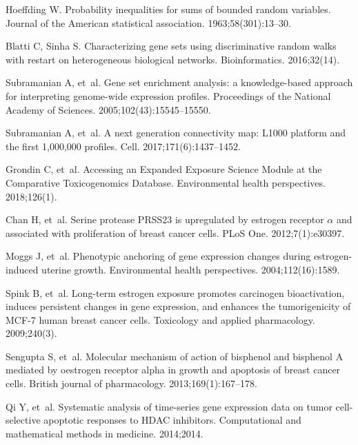 \documentclass[10pt,letterpaper]{article}
\begin{document}
\begin{thebibliography}{10}
Hoeffding W.
\newblock Probability inequalities for sums of bounded random variables.
\newblock Journal of the American statistical association. 1963;58(301):13--30.

Blatti C, Sinha S.
\newblock Characterizing gene sets using discriminative random walks with
  restart on heterogeneous biological networks.
\newblock Bioinformatics. 2016;32(14).

Subramanian A, et~al.
\newblock Gene set enrichment analysis: a knowledge-based approach for
  interpreting genome-wide expression profiles.
\newblock Proceedings of the National Academy of Sciences.
  2005;102(43):15545--15550.

Subramanian A, et~al.
\newblock A next generation connectivity map: L1000 platform and the first
  1,000,000 profiles.
\newblock Cell. 2017;171(6):1437--1452.

Grondin C, et~al.
\newblock Accessing an Expanded Exposure Science Module at the Comparative
  Toxicogenomics Database.
\newblock Environmental health perspectives. 2018;126(1).

Chan H, et~al.
\newblock Serine protease PRSS23 is upregulated by estrogen receptor $\alpha$
  and associated with proliferation of breast cancer cells.
\newblock PLoS One. 2012;7(1):e30397.

Moggs J, et~al.
\newblock Phenotypic anchoring of gene expression changes during
  estrogen-induced uterine growth.
\newblock Environmental health perspectives. 2004;112(16):1589.

Spink B, et~al.
\newblock Long-term estrogen exposure promotes carcinogen bioactivation,
  induces persistent changes in gene expression, and enhances the
  tumorigenicity of MCF-7 human breast cancer cells.
\newblock Toxicology and applied pharmacology. 2009;240(3).

Sengupta S, et~al.
\newblock Molecular mechanism of action of bisphenol and bisphenol A mediated
  by oestrogen receptor alpha in growth and apoptosis of breast cancer cells.
\newblock British journal of pharmacology. 2013;169(1):167--178.

Qi Y, et~al.
\newblock Systematic analysis of time-series gene expression data on tumor
  cell-selective apoptotic responses to HDAC inhibitors.
\newblock Computational and mathematical methods in medicine. 2014;2014.


\end{thebibliography}
\end{document}
